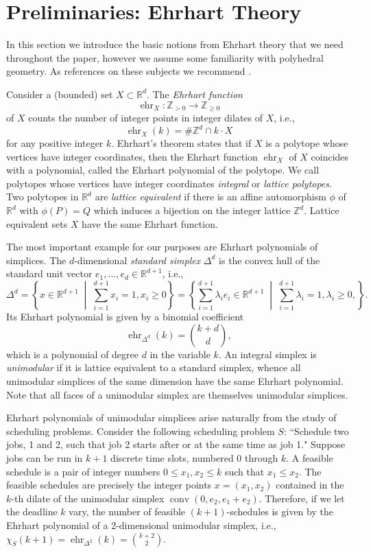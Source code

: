 \documentclass[12pt,reqno]{amsart}
\numberwithin{definition}{section}
\theoremstyle{definition}
\newcommand{\rar}{\rightarrow}
\newcommand{\RR}{\mathbb{R}}
\newcommand{\ZZ}{\mathbb{Z}}
\newcommand{\ehr}{\operatorname{ehr}}
\newcommand{\conv}{\operatorname{conv}}
\newcommand{\mset}[2]{ \left\{ #1 \; \middle| \; #2 \right\}}
\begin{document}
\section{Preliminaries: Ehrhart Theory}
\label{Ehrhart}

In this section we introduce the basic notions from Ehrhart theory that we need throughout the paper, however we assume some familiarity with polyhedral geometry. As references on these subjects we recommend \cite{Beck2007,Ziegler1995}.

Consider a (bounded) set $X\subset \RR^d$. The \emph{Ehrhart function} 
\[
  \ehr_X:\ZZ_{> 0}\rar\ZZ_{\geq 0}
\]
of $X$ counts the number of integer points in integer dilates of $X$, i.e., 
\[
  \ehr_X(k) = \#\ZZ^d \cap k\cdot X
\]
for any positive integer $k$. Ehrhart's theorem states that if $X$ is a polytope whose vertices have integer coordinates, then the Ehrhart function $\ehr_X$ of $X$ coincides with a polynomial, called the Ehrhart polynomial of the polytope. We call polytopes whose vertices have integer coordinates \emph{integral} or \emph{lattice polytopes}. Two polytopes in $\RR^d$ are \emph{lattice equivalent} if there is an affine automorphism $\phi$ of $\RR^d$ with $\phi(P)=Q$ which induces a bijection on the integer lattice $\ZZ^d$. Lattice equivalent sets $X$ have the same Ehrhart function.

The most important example for our purposes are Ehrhart polynomials of simplices. The $d$-dimensional \emph{standard simplex} $\Delta^d$ is the convex hull of the standard unit vector $e_1,\ldots,e_d\in\RR^{d+1}$, i.e.,
\[
  \Delta^d = \mset{x\in\RR^{d+1}}{\sum_{i=1}^{d+1} x_i =1, x_i \geq 0} 
  = \mset{\sum_{i=1}^{d+1} \lambda_i e_i\in\RR^{d+1}}{\sum_{i=1}^{d+1} \lambda_i = 1, \lambda_i\geq 0, }.
\]
Its Ehrhart polynomial is given by a binomial coefficient
\[
  \ehr_{\Delta^d}(k) = \binom{k+d}{d},
\]
which is a polynomial of degree $d$ in the variable $k$. An integral simplex is \emph{unimodular} if it is lattice equivalent to a standard simplex, whence all unimodular simplices of the same dimension have the same Ehrhart polynomial. Note that all faces of a unimodular simplex are themselves unimodular simplices.

Ehrhart polynomials of unimodular simplices arise naturally from the study of scheduling problems. Consider the following scheduling problem $S$: ``Schedule two jobs, 1 and 2, such that job 2 starts after or at the same time as job 1." Suppose jobs can be run in $k+1$ discrete time slots, numbered $0$ through $k$. A feasible schedule is a pair of integer numbers $0\leq x_1,x_2 \leq k$ such that $x_1 \leq x_2$. The feasible schedules are precisely the integer points $x=(x_1,x_2)$ contained in the $k$-th dilate of the unimodular simplex $\conv(0,e_2,e_1+e_2)$. Therefore, if we let the deadline $k$ vary, the number of feasible $(k+1)$-schedules is given by the Ehrhart polynomial of a 2-dimensional unimodular simplex, i.e., $\chi_S(k+1)=\ehr_{\Delta^2}(k)=\binom{k+2}{2}$.
\end{document}
